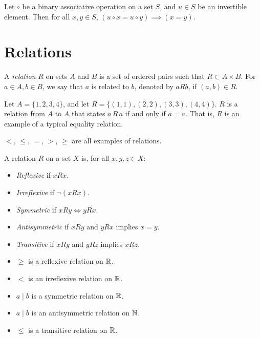 \begin{cor}
    Let $\circ$ be a binary associative operation on a set $S$, and $u \in S$ be an invertible element. Then for all $x, y \in S$, $(u \circ x = u \circ y) \implies (x = y)$.
\end{cor}

\section{Relations}

\begin{defn}
    A \emph{relation} $R$ on sets $A$ and $B$ is a set of ordered pairs such that $R \subset A \times B$. For $a \in A, b \in B$, we say that $a$ is related to $b$, denoted by $a R b$, if $(a, b) \in R$.
\end{defn}

\begin{exmp}
    Let $A = \{1, 2, 3, 4\}$, and let $R = \{(1, 1), (2, 2), (3, 3), (4, 4)\}$. $R$ is a relation from $A$ to $A$ that states $a \,R\, a$ if and only if $a = a$. That is, $R$ is an example of a typical equality relation.
\end{exmp}

\begin{exmp}
    $<$, $\leq$, $=$, $>$, $\geq$ are all examples of relations.
\end{exmp}

\begin{defn}
    A relation $R$ on a set $X$ is, for all $x, y, z \in X$:
    \begin{itemize}
        \item \emph{Reflexive} if $x R x$.
        \item \emph{Irreflexive} if $\neg(x R x)$.
        \item \emph{Symmetric} if $x R y \iff y R x$.
        \item \emph{Antisymmetric} if $x R y$ and $y R x$ implies $x = y$.
        \item \emph{Transitive} if $x R y$ and $y R z$ implies $x R z$.
    \end{itemize}
\end{defn}

\begin{exmp}\proofbreak
    \begin{itemize}
        \item $\geq$ is a reflexive relation on $\mathbb{R}$.
        \item $<$ is an irreflexive relation on $\mathbb{R}$.
        \item $a \mid b$ is a symmetric relation on $\mathbb{R}$.
        \item $a \mid b$ is an antisymmetric relation on $\mathbb{N}$.
        \item $\leq$ is a transitive relation on $\mathbb{R}$.
    \end{itemize}
\end{exmp}

